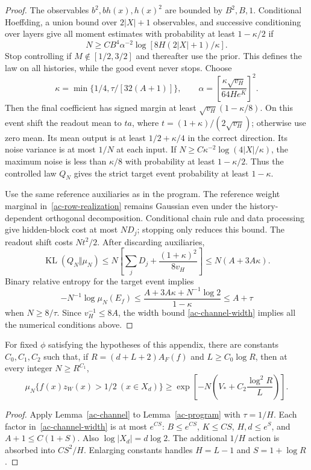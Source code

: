 \begin{proof}
The observables $b^2,bh(x),h(x)^2$ are bounded by $B^2,B,1$.
Conditional Hoeffding, a union bound over $2|X|+1$ observables, and
successive conditioning over layers give all moment estimates with
probability at least $1-\kappa/2$ if
\[
 N\ge CB^4\alpha^{-2}\log[8H(2|X|+1)/\kappa].
\]
Stop controlling if $M\notin[1/2,3/2]$ and thereafter use the prior.
This defines the law on all histories, while the good event never stops.
Choose
\[
 \kappa=\min\{1/4,\tau/[32(A+1)]\},\qquad
 \alpha=\left[\frac{\kappa\sqrt{v_H}}{64He^K}\right]^2.
\]
Then the final coefficient has signed margin at least
$\sqrt{v_H}(1-\kappa/8)$. On this event shift the readout mean to
$ta$, where $t=(1+\kappa)/(2\sqrt{v_H})$; otherwise use zero mean.
Its mean output is at least $1/2+\kappa/4$ in the correct direction.
Its noise variance is at most $1/N$ at each input. If
$N\ge C\kappa^{-2}\log(4|X|/\kappa)$, the maximum noise is less
than $\kappa/8$ with probability at least $1-\kappa/2$. Thus the
controlled law $Q_N$ gives the strict target event probability at
least $1-\kappa$.

Use the same reference auxiliaries as in the program. The reference
weight marginal in~\eqref{ac-row-realization} remains Gaussian even
under the history-dependent orthogonal decomposition. Conditional
chain rule and data processing give hidden-block cost at most $ND_j$;
stopping only reduces this bound. The readout shift costs $Nt^2/2$.
After discarding auxiliaries,
\[
 \operatorname{KL}(Q_N\Vert\mu_N)
 \le N\left[\sum_jD_j+\frac{(1+\kappa)^2}{8v_H}\right]
 \le N(A+3A\kappa).
\]
Binary relative entropy for the target event implies
\[
 -N^{-1}\log\mu_N(E_f)
 \le\frac{A+3A\kappa+N^{-1}\log2}{1-\kappa}\le A+\tau
\]
when $N\ge8/\tau$. Since $v_H^{-1}\le8A$, the width bound
\eqref{ac-channel-width} implies all the numerical conditions above.
\end{proof}

\begin{theorem}\label{ac-target-mass}
For fixed $\phi$ satisfying the hypotheses of this appendix, there
are constants $C_0,C_1,C_2$ such that, if
$R=(d+L+2)A_F(f)$ and $L\ge C_0\log R$, then at every integer
$N\ge R^{C_1}$,
\[
 \mu_N\{f(x)z_W(x)>1/2\ (x\in X_d)\}
 \ge\exp\left[-N\left(V_*+C_2\frac{\log^2R}{L}\right)\right].
\]
\end{theorem}
\begin{proof}
Apply Lemma~\ref{ac-channel} to Lemma~\ref{ac-program} with
$\tau=1/H$. Each factor in~\eqref{ac-channel-width} is at most
$e^{CS}$: $B\le e^{CS}$, $K\le CS$, $H,d\le e^S$, and
$A+1\le C(1+S)$. Also $\log|X_d|=d\log2$. The additional
$1/H$ action is absorbed into $CS^2/H$. Enlarging constants handles
$H=L-1$ and $S=1+\log R$.
\end{proof}

